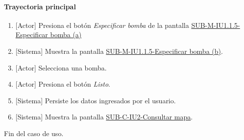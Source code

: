 \paragraph{Trayectoria principal}
	\begin{enumerate}
		\item {[Actor]} Presiona el botón \textit{Especificar bomba} de la pantalla \hyperref[fig:sub-m-iu1.1.5.a]{SUB-M-IU1.1.5-Especificar bomba (a)}
		\item {[Sistema]} Muestra la pantalla \hyperref[fig:sub-m-iu1.1.5.b]{SUB-M-IU1.1.5-Especificar bomba (b)}.
		\item {[Actor]} Selecciona una bomba.
		\item {[Actor]} Presiona el botón \textit{Listo}.
		\item {[Sistema]} Persiste los datos ingresados por el usuario.
		\item {[Sistema]} Muestra la pantalla \hyperref[fig:sub-c-iu2]{SUB-C-IU2-Consultar mapa}.
	\end{enumerate}
	Fin del caso de uso.
